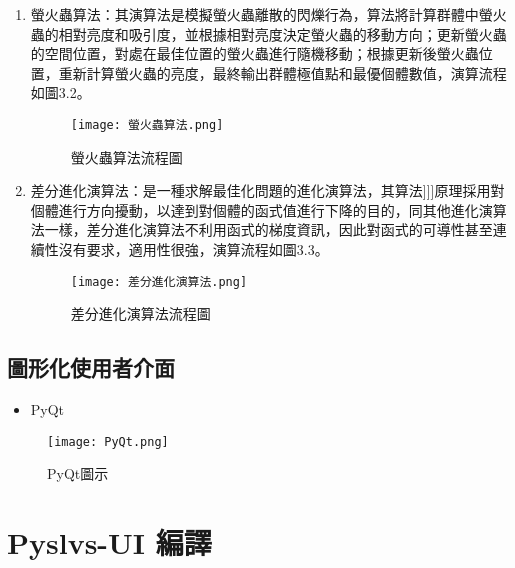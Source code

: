\documentclass[14pt,a4paper]{report}  %
\newcommand{\fourteen}{\fontsize{14pt}{\baselineskip}\selectfont}%
\begin{document}
{\begin{enumerate}
       \item {螢火蟲算法：其演算法是模擬螢火蟲離散的閃爍行為，算法將計算群體中螢火蟲的相對亮度和吸引度，並根據相對亮度決定螢火蟲的移動方向；更新螢火蟲的空間位置，對處在最佳位置的螢火蟲進行隨機移動；根據更新後螢火蟲位置，重新計算螢火蟲的亮度，最終輸出群體極值點和最優個體數值，演算流程如圖3.2。}
       
		\begin{figure}[hbt!]
        \centering
        \texttt{[image: 螢火蟲算法.png]} 
        \caption{螢火蟲算法流程圖}
        \label{fig:scale}
        \end{figure}
    \newpage   
       \item {差分進化演算法：是一種求解最佳化問題的進化演算法，其算法]]]原理採用對個體進行方向擾動，以達到對個體的函式值進行下降的目的，同其他進化演算法一樣，差分進化演算法不利用函式的梯度資訊，因此對函式的可導性甚至連續性沒有要求，適用性很強，演算流程如圖3.3。} 
                       
        \begin{figure}[hbt!]
        \centering
        \texttt{[image: 差分進化演算法.png]} 
        \caption{差分進化演算法流程圖}
        \label{fig:scale}
		\end{figure}
		
	\end{enumerate}
    \newpage
      \subsection{圖形化使用者介面}
      \begin{itemize}
      \item{PyQt}
      \end{itemize}
      \fourteen {Qt被廣泛應用於開發圖形化介面程式。主要特色為使用相同的程式碼皆可在支援的平台上執行與編譯，PyQt是Python語言的GUI編程解決方案之一，與Qt一樣是一個自由軟體，其API也與Qt類似，因此Qt的文件仍然可以應用於此，且與相同性質的軟體比較，PyQt的編程庫文件豐富許多。} 
      \begin{figure}[hbt!]
        \centering
        \texttt{[image: PyQt.png]} 
        \caption{PyQt圖示}
        \label{fig:scale}
        \end{figure}
     
      \section{Pyslvs-UI 編譯}

}
\end{document}
